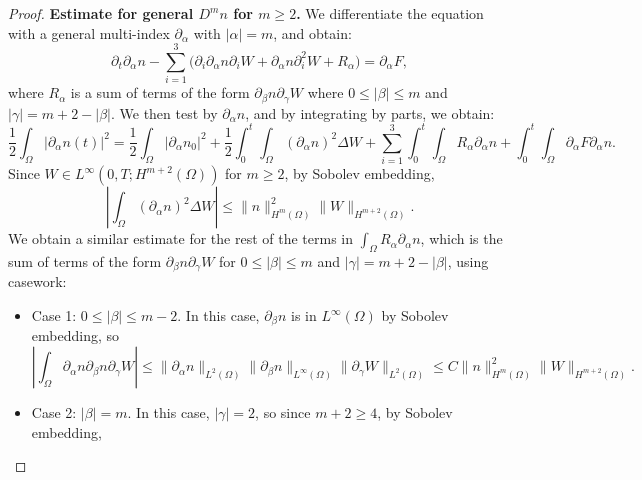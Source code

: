 \documentclass[12pt]{article}
\theoremstyle{plain}
\begin{document}
\begin{proof}
    \medskip

    \noindent \textbf{Estimate for general $D^{m}n$ for $m \ge 2$.} We differentiate the equation with a general multi-index $\partial_{\alpha}$ with $|\alpha| = m$, and obtain:
    \begin{equation*}
        \partial_{t}\partial_{\alpha}n - \sum_{i = 1}^{3} \Big(\partial_{i}\partial_{\alpha}n \partial_{i}W + \partial_{\alpha} n \partial_{i}^{2}W + R_{\alpha}\Big) = \partial_{\alpha}F,
    \end{equation*}
    where $R_{\alpha}$ is a sum of terms of the form $\partial_{\beta}n \partial_{\gamma} W$ where $0 \le |\beta| \le m$ and $|\gamma| = m + 2 - |\beta|$. We then test by $\partial_{\alpha} n$, and by integrating by parts, we obtain:
    \begin{equation*}
        \frac{1}{2} \int_{\Omega} |\partial_{\alpha}n(t)|^{2} = \frac{1}{2} \int_{\Omega} |\partial_{\alpha} n_{0}|^{2} + \frac{1}{2} \int_{0}^{t} \int_{\Omega} (\partial_{\alpha} n)^{2} \Delta W + \sum_{i = 1}^{3} \int_{0}^{t} \int_{\Omega} R_{\alpha} \partial_{\alpha} n + \int_{0}^{t} \int_{\Omega} \partial_{\alpha} F \partial_{\alpha} n.
    \end{equation*}
    Since $W \in L^{\infty}(0, T; H^{m + 2}(\Omega))$ for $m \ge 2$, by Sobolev embedding,
    \begin{equation*}
    \left|\int_{\Omega} (\partial_{\alpha} n)^{2} \Delta W\right| \le \|n\|_{H^{m}(\Omega)}^{2} \|W\|_{H^{m + 2}(\Omega)}.
    \end{equation*}
    We obtain a similar estimate for the rest of the terms in $\displaystyle \int_{\Omega} R_{\alpha} \partial_{\alpha} n$, which is the sum of terms of the form $\partial_{\beta} n \partial_{\gamma} W$ for $0 \le |\beta| \le m$ and $|\gamma| = m + 2 - |\beta|$, using casework:
    \begin{itemize}
        \item Case 1: $0 \le |\beta| \le m - 2$. In this case, $\partial_{\beta} n$ is in $L^{\infty}(\Omega)$ by Sobolev embedding, so
        \begin{equation*}
        \left|\int_{\Omega} \partial_{\alpha} n \partial_{\beta} n \partial_{\gamma} W\right| \le \|\partial_{\alpha} n\|_{L^{2}(\Omega)} \|\partial_{\beta} n\|_{L^{\infty}(\Omega)} \|\partial_{\gamma} W\|_{L^{2}(\Omega)} \le C\|n\|_{H^{m}(\Omega)}^{2} \|W\|_{H^{m + 2}(\Omega)}.
        \end{equation*}
        \item Case 2: $|\beta| = m$. In this case, $|\gamma| = 2$, so since $m + 2 \ge 4$, by Sobolev embedding,

\end{itemize}
\end{proof}
\end{document}
